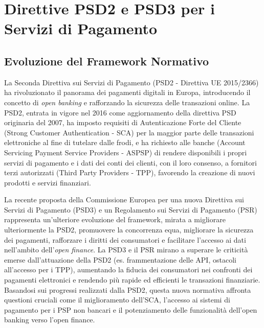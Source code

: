 \section{Direttive PSD2 e PSD3 per i Servizi di Pagamento}
\label{sec:psd}

\subsection{Evoluzione del Framework Normativo}
La Seconda Direttiva sui Servizi di Pagamento (PSD2 - Direttiva UE 2015/2366) ha rivoluzionato il panorama dei pagamenti digitali in Europa, introducendo il concetto di \textit{open banking} e rafforzando la sicurezza delle transazioni online. La PSD2, entrata in vigore nel 2016 come aggiornamento della direttiva PSD originaria del 2007, ha imposto requisiti di Autenticazione Forte del Cliente (Strong Customer Authentication - SCA) per la maggior parte delle transazioni elettroniche al fine di tutelare dalle frodi, e ha richiesto alle banche (Account Servicing Payment Service Providers - ASPSP) di rendere disponibili i propri servizi di pagamento e i dati dei conti dei clienti, con il loro consenso, a fornitori terzi autorizzati (Third Party Providers - TPP), favorendo la creazione di nuovi prodotti e servizi finanziari.

La recente proposta della Commissione Europea per una nuova Direttiva sui Servizi di Pagamento (PSD3) e un Regolamento sui Servizi di Pagamento (PSR) rappresenta un'ulteriore evoluzione del framework, mirata a migliorare ulteriormente la PSD2, promuovere la concorrenza equa, migliorare la sicurezza dei pagamenti, rafforzare i diritti dei consumatori e facilitare l'accesso ai dati nell'ambito dell'\textit{open finance}. La PSD3 e il PSR mirano a superare le criticità emerse dall'attuazione della PSD2 (es. frammentazione delle API, ostacoli all'accesso per i TPP), aumentando la fiducia dei consumatori nei confronti dei pagamenti elettronici e rendendo più rapide ed efficienti le transazioni finanziarie. Basandosi sui progressi realizzati dalla PSD2, questa nuova normativa affronta questioni cruciali come il miglioramento dell'SCA, l'accesso ai sistemi di pagamento per i PSP non bancari e il potenziamento delle funzionalità dell'open banking verso l'open finance.

